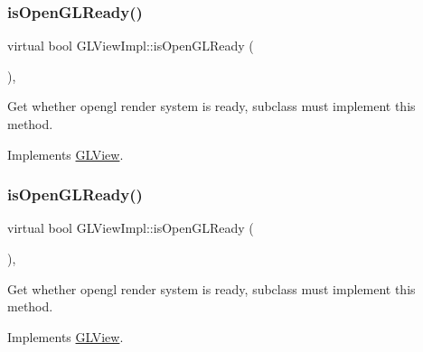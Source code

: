 \mbox{\label{classGLViewImpl_af539e58d1d28db65ba47f107c9c801d7}} 
\subsubsection{\texorpdfstring{is\+Open\+G\+L\+Ready()}{isOpenGLReady()}\hspace{0.1cm}{\footnotesize\ttfamily [6/9]}}
{\footnotesize\ttfamily virtual bool G\+L\+View\+Impl\+::is\+Open\+G\+L\+Ready (\begin{DoxyParamCaption}{ }\end{DoxyParamCaption})\hspace{0.3cm}{\ttfamily [override]}, {\ttfamily [virtual]}}

Get whether opengl render system is ready, subclass must implement this method. 

Implements \hyperlink{classGLView_a23326d6cbff86205a0d5fa953557838d}{G\+L\+View}.

\mbox{\label{classGLViewImpl_af539e58d1d28db65ba47f107c9c801d7}} 
\subsubsection{\texorpdfstring{is\+Open\+G\+L\+Ready()}{isOpenGLReady()}\hspace{0.1cm}{\footnotesize\ttfamily [7/9]}}
{\footnotesize\ttfamily virtual bool G\+L\+View\+Impl\+::is\+Open\+G\+L\+Ready (\begin{DoxyParamCaption}{ }\end{DoxyParamCaption})\hspace{0.3cm}{\ttfamily [override]}, {\ttfamily [virtual]}}

Get whether opengl render system is ready, subclass must implement this method. 

Implements \hyperlink{classGLView_a23326d6cbff86205a0d5fa953557838d}{G\+L\+View}.

\mbox{\label{classGLViewImpl_af539e58d1d28db65ba47f107c9c801d7}} 
